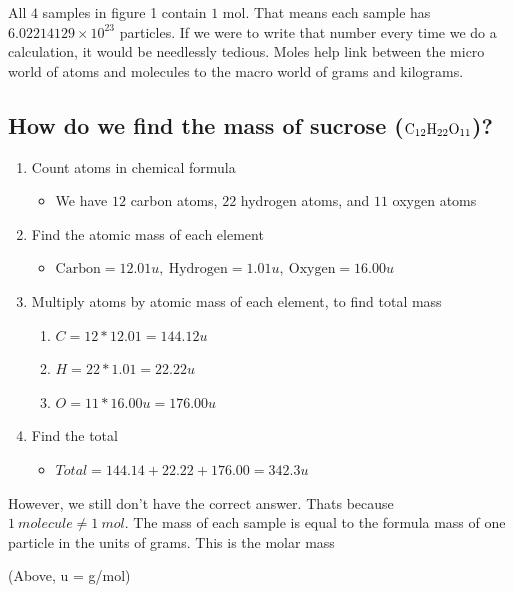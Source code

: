\documentclass{scrartcl}
\begin{document}
All \(4\) samples in figure 1 contain \(1\) mol. That means each sample has
\(6.02214129 × 10^{23}\) particles. If we were to write that number every
time we do a calculation, it would be needlessly tedious. Moles help link
between the micro world of atoms and molecules to the macro world of grams
and kilograms.

\subsection{How do we find the mass of sucrose (\(\ce{C12H22O11}\))?}
\label{sec:orga4cdada}
\begin{enumerate}
\item Count atoms in chemical formula
\begin{itemize}
\item We have \(12\) carbon atoms, \(22\) hydrogen atoms, and \(11\) oxygen atoms
\end{itemize}
\item Find the atomic mass of each element 
\begin{itemize}
\item \(\text{Carbon}=12.01u,\ \text{Hydrogen} = 1.01u,\ \text{Oxygen} = 16.00u\)
\end{itemize}
\item Multiply atoms by atomic mass of each element, to find total mass
\begin{enumerate}
\item \(C = 12*12.01 = 144.12u\)
\item \(H = 22*1.01 = 22.22u\)
\item \(O = 11*16.00u = 176.00u\)
\end{enumerate}
\item Find the total
\begin{itemize}
\item \(Total = 144.14 + 22.22 + 176.00 = 342.3u\)
\end{itemize}
\end{enumerate}

However, we still don't have the correct answer. Thats because \(1\
   molecule\neq1\ mol\). The mass of each sample is equal to the formula mass of
one particle in the units of grams. This is the molar mass

(Above, u = g/mol)
\end{document}
